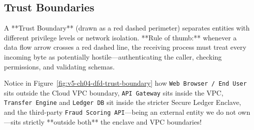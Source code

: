 \subsection{Trust Boundaries}

A **Trust Boundary** (drawn as a red dashed perimeter) separates entities with different privilege levels or network isolation. **Rule of thumb:** whenever a data flow arrow crosses a red dashed line, the receiving process must treat every incoming byte as potentially hostile---authenticating the caller, checking permissions, and validating schemas.

Notice in Figure~\ref{fig:v5-ch04-dfd-trust-boundary} how \texttt{Web Browser / End User} sits outside the Cloud VPC boundary, \texttt{API Gateway} sits inside the VPC, \texttt{Transfer Engine} and \texttt{Ledger DB} sit inside the stricter Secure Ledger Enclave, and the third-party \texttt{Fraud Scoring API}---being an external entity we do not own---sits strictly **outside both** the enclave and VPC boundaries!

